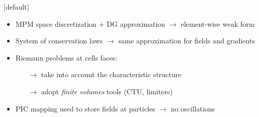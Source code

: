 \documentclass[11pt,aspectratio=169]{beamer}
\makeatletter
\newenvironment{withoutheadline}{
  \setbeamertemplate{headline}[default]
  \def\beamer@entrycode{\vspace*{-\headheight}}
}{}
\makeatother
\begin{document}
\begin{withoutheadline}
\begin{frame}[standout]{}
  \vspace{-.5cm}
  \begin{scriptsize}
      
  
    \begin{overprint}
      \vspace{-0.3cm}
      \begin{block}{\footnotesize {}}
      \vskip -6pt
        \begin{itemize}
        \item MPM space discretization + DG approximation $\rightarrow$ element-wise weak form
        \item System of conservation laws $\rightarrow$ same approximation for fields and gradients
        \item Riemann problems at cells faces:
          \begin{itemize}
          \item[$\rightarrow$] \scriptsize take into account the characteristic structure 
          \item[$\rightarrow$] \scriptsize adopt \textit{finite volumes} tools (CTU, limiters) 
          \end{itemize}
        \item PIC mapping used to store fields at particles $\rightarrow$ no oscillations %
        \end{itemize}
      \end{block}
    

\end{overprint}
\end{scriptsize}
\end{frame}
\end{withoutheadline}
\end{document}
